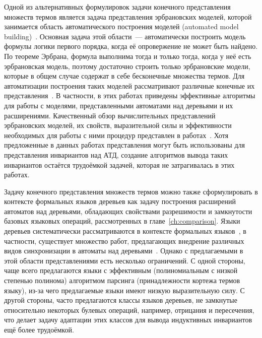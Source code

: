 Одной из альтернативных формулировок задачи конечного представления множеств термов является задача представления эрбрановских моделей, которой занимается область автоматического построения моделей (automated model building)~\cite{caferra2013automated}. Основная задача этой области~--- автоматически построить модель формулы логики первого порядка, когда её опровержение не может быть найдено. По теореме Эрбрана, формула выполнима тогда и только тогда, когда у неё есть эрбрановская модель, поэтому достаточно строить только эрбрановские модели, которые в общем случае содержат в себе бесконечные множества термов. Для автоматизации построения таких моделей рассматривают различные конечные их представления~\cite{fermuller2007model,fermuller2005model,teucke2019expressivity,gramlich2002algorithmic}. В частности, в этих работах приведены эффективные алгоритмы для работы с моделями, представленными автоматами над деревьями и их расширениями. Качественный обзор вычислительных представлений эрбрановских моделей, их свойств, выразительной силы и эффективности необходимых для работы с ними процедур представлен в работах~\cite{matzinger1998computational, matzinger2000computational}. Хотя предложенные в данных работах представления могут быть использованы для представления инвариантов над АТД, создание алгоритмов вывода таких инвариантов остаётся трудоёмкой задачей, которая не затрагивалась в этих работах.

Задачу конечного представления множеств термов можно также сформулировать в контексте формальных языков деревьев как задачу построения расширений автоматов над деревьями, обладающих свойствами разрешимости и замкнутости базовых языковых операций, рассмотренных в главе~\ref{ch:comparison}. Языки деревьев систематически рассматриваются в контексте формальных языков~\cite{10.5555/267871}, в частности, существует множество работ, предлагающих внедрение различных видов синхронизации в автоматы над деревьями~\cite{chabin2007visibly, gouranton2001synchronized, limet2001weakly, chabin2006synchronized, jacquemard2009rigid, engelfriet2017multiple}. Однако с предлагаемыми в этой области представлениями есть несколько ограничений. С одной стороны, чаще всего предлагаются языки с эффективным (полиномиальным с низкой степенью полинома) алгоритмом парсинга (принадлежности кортежа термов языку), из-за чего предлагаемые языки имеют низкую выразительную силу. С другой стороны, часто предлагаются классы языков деревьев, не замкнутые относительно некоторых булевых операций, например, отрицания и пересечения, что делает задачу адаптации этих классов для вывода индуктивных инвариантов ещё более трудоёмкой.

